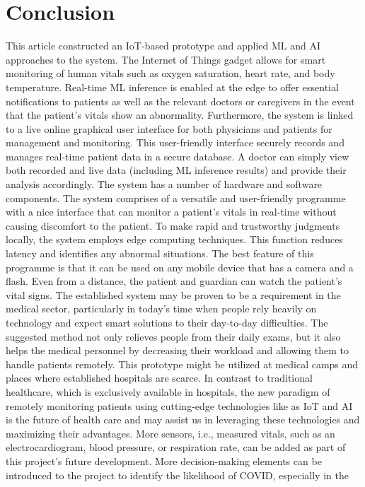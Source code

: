 \documentclass{bmcart}
\begin{document}
\section*{Conclusion}
This article constructed an IoT-based prototype and applied ML and AI approaches
to the system. The Internet of Things gadget allows for smart monitoring of
human vitals such as oxygen saturation, heart rate, and body temperature.
Real-time ML inference is enabled at the edge to offer essential notifications
to patients as well as the relevant doctors or caregivers in the event that the
patient's vitals show an abnormality. Furthermore, the system is linked to a
live online graphical user interface for both physicians and patients for
management and monitoring. This user-friendly interface securely records and
manages real-time patient data in a secure database. A doctor can simply view
both recorded and live data (including ML inference results) and provide their
analysis accordingly. The system has a number of hardware and software
components. The system comprises of a versatile and user-friendly programme with
a nice interface that can monitor a patient's vitals in real-time without
causing discomfort to the patient. To make rapid and trustworthy judgments
locally, the system employs edge computing techniques. This function reduces
latency and identifies any abnormal situations. The best feature of this
programme is that it can be used on any mobile device that has a camera and a
flash. Even from a distance, the patient and guardian can watch the patient's
vital signs. The established system may be proven to be a requirement in the
medical sector, particularly in today's time when people rely heavily on
technology and expect smart solutions to their day-to-day difficulties. The
suggested method not only relieves people from their daily exams, but it also
helps the medical personnel by decreasing their workload and allowing them to
handle patients remotely. This prototype might be utilized at medical camps and
places where established hospitals are scarce. In contrast to traditional
healthcare, which is exclusively available in hospitals, the new paradigm of
remotely monitoring patients using cutting-edge technologies like as IoT and AI
is the future of health care and may assist us in leveraging these technologies
and maximizing their advantages. More sensors, i.e., measured vitals, such as an
electrocardiogram, blood pressure, or respiration rate, can be added as part of
this project's future development. More decision-making elements can be
introduced to the project to identify the likelihood of COVID, especially in the
\end{document}

